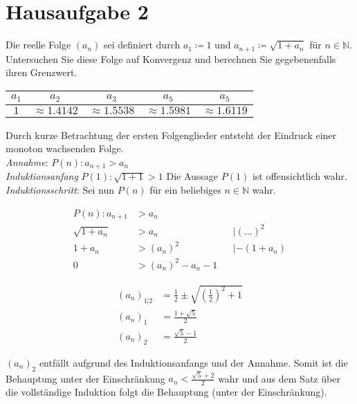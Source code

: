 \documentclass{article}
\begin{document}
\newpage
\section*{Hausaufgabe 2}

Die reelle Folge $(a_n)$ sei definiert durch $a_1 \coloneqq 1$ und
$a_{n + 1} \coloneqq \sqrt{1 + a_n}$ für $n \in \mathbb{N}$. Untersuchen Sie diese Folge auf Konvergenz und
berechnen Sie gegebenenfalls ihren Grenzwert.

\begin{tabular}{cccc c}
  $a_1$ & $a_2$ & $a_3$ & $a_5$ & $a_5$ \\
  \hline
  $1$ & $\approx 1.4142$ & $\approx 1.5538$ & $\approx 1.5981$ & $\approx 1.6119$
\end{tabular}

Durch kurze Betrachtung der ersten Folgenglieder entsteht der Eindruck einer monoton wachsenden Folge. \\
\emph{Annahme}: $P(n) \colon a_{n+1} > a_n$ \\
\emph{Induktionsanfang} $P(1) \colon \sqrt{1 + 1} > 1$
Die Aussage $P(1)$ ist offensichtlich wahr. \\
\emph{Induktionsschritt}: Sei nun $P(n)$ für ein beliebiges $n \in \mathbb{N}$ wahr.

\begin{minipage}[t]{.4\textwidth}
  \begin{align*}
    P(n) \colon a_{n+1} &> a_n \\
    \sqrt{1 + a_n} &> a_n  && |(\ldots)^2 \\
    1 + a_n &> (a_n)^2     && | -(1 + a_n)\\
    0 &> (a_n)^2 - a_n - 1
  \end{align*}
\end{minipage}
\hfill
\vrule
\hfill
\begin{minipage}[t]{.4\textwidth}
  \label{defn:liman}
  \begin{align*}
    (a_n)_{1|2} &= \frac{1}{2} \pm \sqrt{\left(\frac{1}{2}\right)^2 + 1} \\
    (a_n)_1 &= \frac{1 + \sqrt{5}}{2} \\
    (a_n)_2 &= \frac{\sqrt{5} - 1}{2}
  \end{align*}
\end{minipage}

$(a_n)_2$ entfällt aufgrund des Induktionsanfangs und der Annahme.
Somit ist die Behauptung unter der Einschränkung $a_n < \frac{\sqrt{5} + 2}{2}$ wahr und aus
dem Satz über die vollständige Induktion folgt die Behauptung (unter der Einschränkung).
\end{document}
